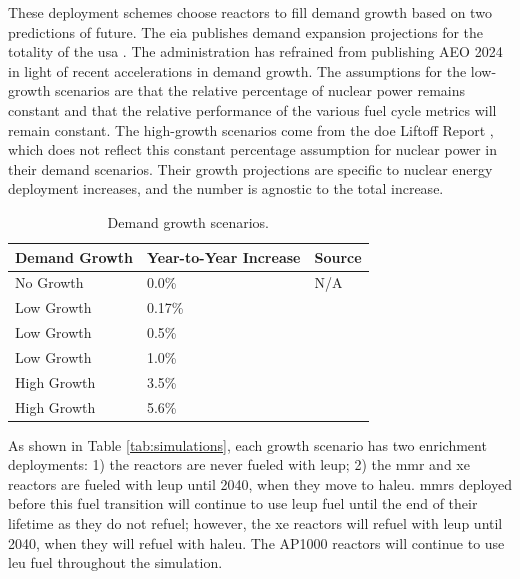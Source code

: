 These deployment schemes choose reactors to fill demand growth based on two predictions of future. The \gls{eia} publishes demand expansion projections for the totality of the \gls{usa} \cite{eia_aeo_2023}. The administration has refrained from publishing AEO 2024 in light of recent accelerations in demand growth. The assumptions for the low-growth scenarios are that the relative percentage of nuclear power remains constant and that the relative performance of the various fuel cycle metrics will remain constant. The high-growth scenarios come from the \gls{doe} Liftoff Report \cite{julie_liftoff_pathways_2024}, which does not reflect this constant percentage assumption for nuclear power in their demand scenarios. Their growth projections are specific to nuclear energy deployment increases, and the number is agnostic to the total increase.

\begin{table}[H]
    \centering
    \caption{Demand growth scenarios.}
    \label{tab:demand_scenarios}
    \begin{tabular}{l l l}
        \hline
        \textbf{Demand Growth} & \textbf{Year-to-Year Increase} & \textbf{Source}\\
        \hline
        No Growth & 0.0\% & N/A\\
        Low Growth & 0.17\% & \cite{eia_aeo_2023}\\
        Low Growth & 0.5\% & \cite{eia_aeo_2023}\\
        Low Growth & 1.0\% & \cite{eia_aeo_2023}\\
        High Growth & 3.5\% & \cite{julie_liftoff_pathways_2024} \\
        High Growth & 5.6\% & \cite{julie_liftoff_pathways_2024}\\
        \hline
    \end{tabular}
  \end{table}

As shown in Table \ref{tab:simulations}, each growth scenario has two enrichment deployments: 1) the reactors are never fueled with \gls{leup}; 2) the \gls{mmr} and \gls{xe} reactors are fueled with \gls{leup} until 2040, when they move to \gls{haleu}. \glspl{mmr} deployed before this fuel transition will continue to use \gls{leup} fuel until the end of their lifetime as they do not refuel; however, the \gls{xe} reactors will refuel with \gls{leup} until 2040, when they will refuel with \gls{haleu}. The AP1000 reactors will continue to use \gls{leu} fuel throughout the simulation.


